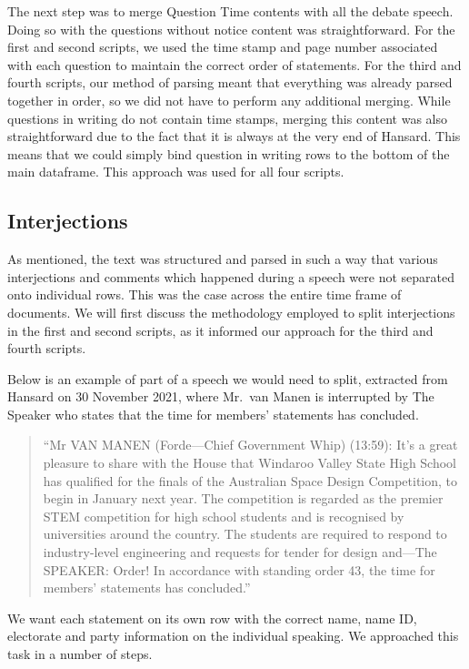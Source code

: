 \documentclass[
  letterpaper,
  DIV=11,
  numbers=noendperiod]{scrartcl}
\begin{document}
The next step was to merge Question Time contents with all the debate
speech. Doing so with the questions without notice content was
straightforward. For the first and second scripts, we used the time
stamp and page number associated with each question to maintain the
correct order of statements. For the third and fourth scripts, our
method of parsing meant that everything was already parsed together in
order, so we did not have to perform any additional merging. While
questions in writing do not contain time stamps, merging this content
was also straightforward due to the fact that it is always at the very
end of Hansard. This means that we could simply bind question in writing
rows to the bottom of the main dataframe. This approach was used for all
four scripts.

\hypertarget{sec-interject}{%
\subsection{Interjections}\label{sec-interject}}

As mentioned, the text was structured and parsed in such a way that
various interjections and comments which happened during a speech were
not separated onto individual rows. This was the case across the entire
time frame of documents. We will first discuss the methodology employed
to split interjections in the first and second scripts, as it informed
our approach for the third and fourth scripts.

Below is an example of part of a speech we would need to split,
extracted from Hansard on 30 November 2021, where Mr.~van Manen is
interrupted by The Speaker who states that the time for members'
statements has concluded.

\begin{quote}
``Mr VAN MANEN (Forde---Chief Government Whip) (13:59): It's a great
pleasure to share with the House that Windaroo Valley State High School
has qualified for the finals of the Australian Space Design Competition,
to begin in January next year. The competition is regarded as the
premier STEM competition for high school students and is recognised by
universities around the country. The students are required to respond to
industry-level engineering and requests for tender for design and---The
SPEAKER: Order! In accordance with standing order 43, the time for
members' statements has concluded.''
\end{quote}

We want each statement on its own row with the correct name, name ID,
electorate and party information on the individual speaking. We
approached this task in a number of steps.
\end{document}
